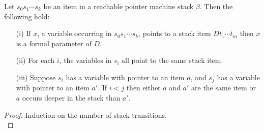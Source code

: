 \begin{lemma}\label{lem:pmgroups}
Let $s_0s_1 \cdots s_k$ be an item in a reachable pointer machine
stack $\beta$. Then the following hold:
\begin{enumerate}
\item[(i)] If $x$, a variable occurring in $s_0s_1 \cdots s_k$, points to a stack item $D t_1 \cdots t_m$ then $x$ is a formal
parameter of $D$.

\item[(ii)] For each $i$, the variables in $s_i$ all point to the same stack item.

\item[(iii)] Suppose $s_i$ has a variable with pointer to an item
$a$, and $s_j$ has a variable with pointer to an item $a'$. If $i
< j$ then either $a$ and $a'$ are the same item or $a$ occurs
deeper in the stack than $a'$.
\end{enumerate}
\end{lemma}

\begin{proof}Induction on the number of stack transitions.\\
\end{proof}

